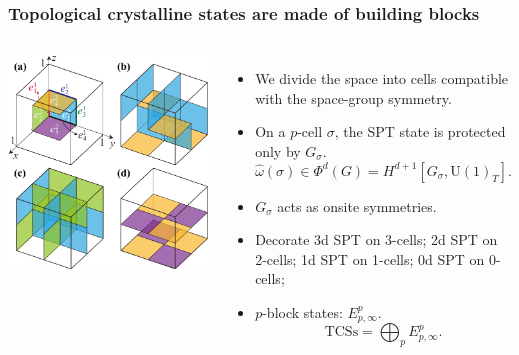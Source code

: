 \documentclass[xcolor=table, 10pt, aspectratio=43]{beamer}
\newcommand{\uone}{\mathrm U(1)}
\begin{document}
\begin{frame}
	\frametitle{Topological crystalline states are made of building blocks}
	\begin{columns}
		\begin{center}
			\includegraphics[width=\textwidth]{blocks}
		\end{center}
		\begin{itemize}
			\item We divide the space into cells compatible with the space-group symmetry.
			\item On a $p$-cell $\sigma$, the SPT state is protected only by $G_\sigma$.
			\[\hat\omega(\sigma)\in \Phi^d(G) = H^{d+1}[G_\sigma,\uone_T].\]
			\item $G_\sigma$ acts as onsite symmetries.
			\item Decorate 3d SPT on 3-cells; 2d SPT on 2-cells; 1d SPT on 1-cells; 0d SPT on 0-cells;
			\item $p$-block states: $E^p_{p,\infty}$.
			\[\text{TCSs} = \bigoplus_p E^p_{p,\infty}.\]
		\end{itemize}
	\end{columns}
\end{frame}
\end{document}
